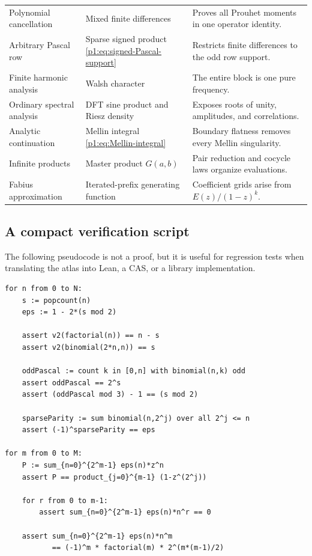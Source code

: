 \documentclass[11pt,oneside]{article}
\numberwithin{equation}{section}
\theoremstyle{definition}
\theoremstyle{remark}
\begin{document}
\begin{longtable}{@{}>{\raggedright\arraybackslash}p{}>{\raggedright\arraybackslash}p{}>{\raggedright\arraybackslash}p{}@{}}
Polynomial cancellation & Mixed finite differences & Proves all Prouhet moments in one operator identity. \\
Arbitrary Pascal row & Sparse signed product \eqref{p1:eq:signed-Pascal-support} & Restricts finite differences to the odd row support. \\
Finite harmonic analysis & Walsh character & The entire block is one pure frequency. \\
Ordinary spectral analysis & DFT sine product and Riesz density & Exposes roots of unity, amplitudes, and correlations. \\
Analytic continuation & Mellin integral \eqref{p1:eq:Mellin-integral} & Boundary flatness removes every Mellin singularity. \\
Infinite products & Master product \(G(a,b)\) & Pair reduction and cocycle laws organize evaluations. \\
Fabius approximation & Iterated-prefix generating function & Coefficient grids arise from \(E(z)/(1-z)^k\). \\
\bottomrule
\end{longtable}
\renewcommand{\arraystretch}{1}

\subsection{A compact verification script}

The following pseudocode is not a proof, but it is useful for regression tests
when translating the atlas into Lean, a CAS, or a library implementation.

\begin{lstlisting}[style=pseudo]
for n from 0 to N:
    s := popcount(n)
    eps := 1 - 2*(s mod 2)

    assert v2(factorial(n)) == n - s
    assert v2(binomial(2*n,n)) == s

    oddPascal := count k in [0,n] with binomial(n,k) odd
    assert oddPascal == 2^s
    assert (oddPascal mod 3) - 1 == (s mod 2)

    sparseParity := sum binomial(n,2^j) over all 2^j <= n
    assert (-1)^sparseParity == eps

for m from 0 to M:
    P := sum_{n=0}^{2^m-1} eps(n)*z^n
    assert P == product_{j=0}^{m-1} (1-z^(2^j))

    for r from 0 to m-1:
        assert sum_{n=0}^{2^m-1} eps(n)*n^r == 0

    assert sum_{n=0}^{2^m-1} eps(n)*n^m
           == (-1)^m * factorial(m) * 2^(m*(m-1)/2)
\end{lstlisting}
\end{document}
